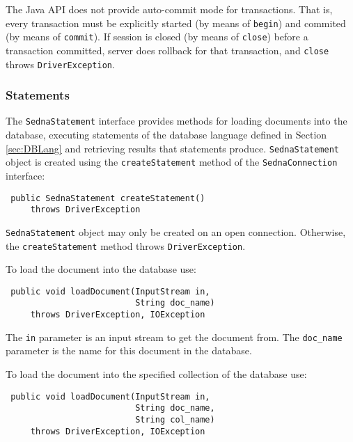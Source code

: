 \documentclass[a4paper,12pt]{article}
\begin{document}
The Java API does not provide auto-commit mode for transactions. That is, every
transaction must be explicitly started (by means of \verb!begin!) and commited
(by means of \verb!commit!). If session is closed (by means of \verb!close!)
before a transaction committed, server does rollback for that transaction, and
\verb!close! throws \verb!DriverException!.


\subsubsection{Statements}

The \verb!SednaStatement! interface provides methods for loading documents into
the database, executing statements of the database language defined in Section
\ref{sec:DBLang} and retrieving results that statements produce.
\verb!SednaStatement! object is created using the \verb!createStatement! method
of the \verb!SednaConnection! interface:

\begin{verbatim}
 public SednaStatement createStatement()
     throws DriverException
\end{verbatim}

\verb!SednaStatement! object may only be created on an open connection.
Otherwise, the \verb!createStatement! method throws \verb!DriverException!.

To load the document into the database use:

\begin{verbatim}
 public void loadDocument(InputStream in,
                          String doc_name)
     throws DriverException, IOException
\end{verbatim}

The \verb!in! parameter is an input stream to get the document from. The
\verb!doc_name! parameter is the name for this document in the database.

To load the document into the specified collection of the database use:

\begin{verbatim}
 public void loadDocument(InputStream in,
                          String doc_name,
                          String col_name)
     throws DriverException, IOException
\end{verbatim}
\end{document}
